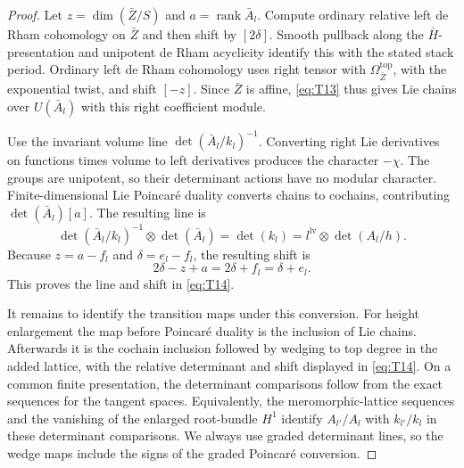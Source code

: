 \begin{proof}
Let $z=\dim(\bar Z/S)$ and $a=\operatorname{rank}\bar A_l$.
Compute ordinary relative left de Rham cohomology on $\bar Z$ and
then shift by $[2\delta]$.  Smooth pullback along the
$\bar H$-presentation and unipotent de Rham acyclicity identify this
with the stated stack period.  Ordinary left de Rham cohomology uses
right tensor with $\Omega^{\mathrm{top}}_{\bar Z}$, with the
exponential twist, and shift $[-z]$.  Since $\bar Z$ is affine,
\eqref{eq:T13} thus gives Lie chains over $U(\bar A_l)$ with this
right coefficient module.

Use the invariant volume line
$\det(\bar A_l/k_l)^{-1}$.  Converting right Lie derivatives on
functions times volume to left derivatives produces the character
$-\chi$.  The groups are unipotent, so their determinant actions
have no modular character.  Finite-dimensional Lie Poincar\'e
duality converts chains to cochains, contributing
$\det(\bar A_l)[a]$.  The resulting line is
\[
 \det(\bar A_l/k_l)^{-1}\otimes\det(\bar A_l)
       =\det(k_l)
       =l^{\mathrm{lv}}\otimes\det(A_l/h).
\]
Because $z=a-f_l$ and $\delta=e_l-f_l$, the resulting shift is
\[
 2\delta-z+a=2\delta+f_l=\delta+e_l.
\]
This proves the line and shift in \eqref{eq:T14}.

It remains to identify the transition maps under this conversion.
For height enlargement the map before Poincar\'e duality is the
inclusion of Lie chains.  Afterwards it is the cochain inclusion
followed by wedging to top degree in the added lattice, with the
relative determinant and shift displayed in \eqref{eq:T14}.  On a
common finite presentation, the determinant comparisons follow from
the exact sequences for the tangent spaces.  Equivalently, the
meromorphic-lattice sequences and the vanishing of the enlarged
root-bundle $H^1$ identify $A_{l'}/A_l$ with $k_{l'}/k_l$ in these
determinant comparisons.  We always use graded determinant lines,
so the wedge maps include the signs of the graded Poincar\'e
conversion.


\end{proof}
